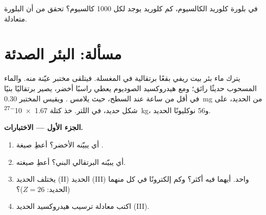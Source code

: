 \begin{exercise}[$\star\star\star$]\label{exo:g9:ions:12}
في بلورة كلوريد الكالسيوم، كم  كلوريد يوجد لكل 1000  كالسيوم؟
تحقق من أن البلورة متعادلة.
\end{exercise}

\section{مسألة: البئر الصدئة}

\begin{problem}
\label{pb:g9:ions:1}
يترك ماء بئر بيت ريفي بقعًا برتقالية في المغسلة. فيتلقى مختبر عيّنة منه.
والماء المسحوب حديثًا رائق؛ ومع هيدروكسيد الصوديوم يعطي راسبًا أخضر، يصير
برتقاليًا بنيًا في أقل من ساعة عند السطح، حيث يلامس . ويقيس المختبر
\qty{0.30}{mg} من الحديد، على شكل  حديد، في اللتر. خذ كتلة
 \qty{1.67e-27}{kg}، و56 نوكليونًا 
الحديد.

\medskip
\noindent\textbf{الجزء الأول --- الاختبارات.}
\begin{enumerate}
  \item أي  يبيّنه  الأخضر؟ أعطِ صيغة
        .
  \item أي  يبيّنه  البرتقالي البني؟ أعطِ
        صيغته.
  \item يختلف  الحديد (II)  الحديد (III)  واحد.
        أيهما فيه  أكثر؟ وكم إلكترونًا في كل منهما
        (الحديد: $Z = 26$)؟
  \item اكتب معادلة ترسيب هيدروكسيد الحديد (III).
\end{enumerate}


\end{problem}

